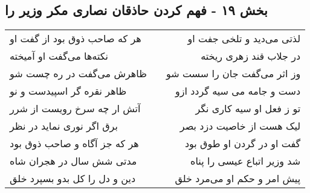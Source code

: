 \begin{center}
\section*{بخش ۱۹ - فهم کردن حاذقان نصاری مکر وزیر را}
\label{sec:sh019}
\begin{longtable}{l p{0.5cm} r}
هر که صاحب ذوق بود از گفت او
&&
لذتی می‌دید و تلخی جفت او
\\
نکته‌ها می‌گفت او آمیخته
&&
در جلاب قند زهری ریخته
\\
ظاهرش می‌گفت در ره چست شو
&&
وز اثر می‌گفت جان را سست شو
\\
ظاهر نقره گر اسپیدست و نو
&&
دست و جامه می سیه گردد ازو
\\
آتش ار چه سرخ رویست از شرر
&&
تو ز فعل او سیه کاری نگر
\\
برق اگر نوری نماید در نظر
&&
لیک هست از خاصیت دزد بصر
\\
هر که جز آگاه و صاحب ذوق بود
&&
گفت او در گردن او طوق بود
\\
مدتی شش سال در هجران شاه
&&
شد وزیر اتباع عیسی را پناه
\\
دین و دل را کل بدو بسپرد خلق
&&
پیش امر و حکم او می‌مرد خلق
\\
\end{longtable}
\end{center}
